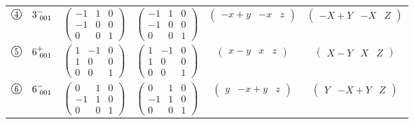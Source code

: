 \documentclass[fleqn,10pt,landscape]{jsarticle}
\begin{document}
\begin{center}
\begin{longtable}{lcccc}
$ {\ooalign{\hfil\resizebox{.8\width}{\height}{4}\hfil\crcr\raise.1ex\hbox{\large$\bigcirc$}}}\quad 3^{-}_{\,\,001} $ & $ \begin{pmatrix} -1 & 1 & 0 \\ -1 & 0 & 0 \\ 0 & 0 & 1 \end{pmatrix} $ & $ \begin{pmatrix} -1 & 1 & 0 \\ -1 & 0 & 0 \\ 0 & 0 & 1 \end{pmatrix} $ & $ \begin{pmatrix} - x + y & - x & z \end{pmatrix} $ & $ \begin{pmatrix} - X + Y & - X & Z \end{pmatrix} $ \\
$ {\ooalign{\hfil\resizebox{.8\width}{\height}{5}\hfil\crcr\raise.1ex\hbox{\large$\bigcirc$}}}\quad 6^{+}_{\,\,001} $ & $ \begin{pmatrix} 1 & -1 & 0 \\ 1 & 0 & 0 \\ 0 & 0 & 1 \end{pmatrix} $ & $ \begin{pmatrix} 1 & -1 & 0 \\ 1 & 0 & 0 \\ 0 & 0 & 1 \end{pmatrix} $ & $ \begin{pmatrix} x - y & x & z \end{pmatrix} $ & $ \begin{pmatrix} X - Y & X & Z \end{pmatrix} $ \\
$ {\ooalign{\hfil\resizebox{.8\width}{\height}{6}\hfil\crcr\raise.1ex\hbox{\large$\bigcirc$}}}\quad 6^{-}_{\,\,001} $ & $ \begin{pmatrix} 0 & 1 & 0 \\ -1 & 1 & 0 \\ 0 & 0 & 1 \end{pmatrix} $ & $ \begin{pmatrix} 0 & 1 & 0 \\ -1 & 1 & 0 \\ 0 & 0 & 1 \end{pmatrix} $ & $ \begin{pmatrix} y & - x + y & z \end{pmatrix} $ & $ \begin{pmatrix} Y & - X + Y & Z \end{pmatrix} $ \\

\end{longtable}
\end{center}
\end{document}
